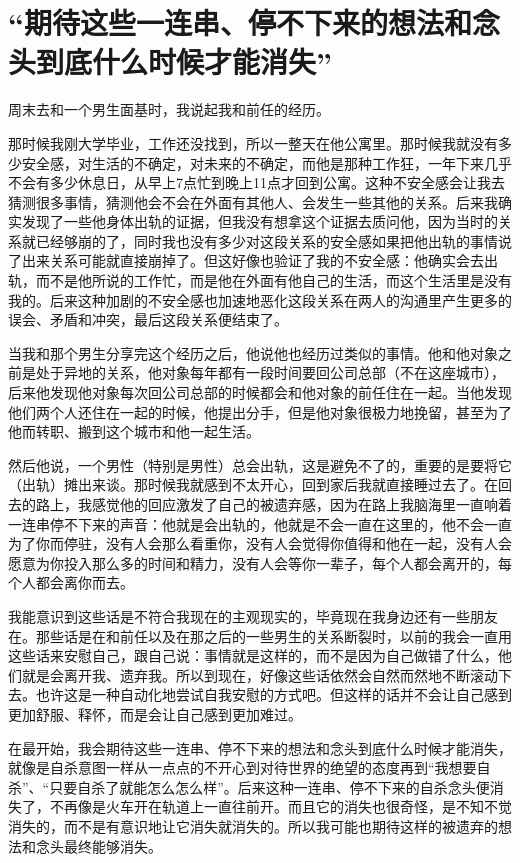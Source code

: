 \chapter{“期待这些一连串、停不下来的想法和念头到底什么时候才能消失”}




周末去和一个男生面基时，我说起我和前任的经历。

那时候我刚大学毕业，工作还没找到，所以一整天在他公寓里。那时候我就没有多少安全感，对生活的不确定，对未来的不确定，而他是那种工作狂，一年下来几乎不会有多少休息日，从早上7点忙到晚上11点才回到公寓。这种不安全感会让我去猜测很多事情，猜测他会不会在外面有其他人、会发生一些其他的关系。后来我确实发现了一些他身体出轨的证据，但我没有想拿这个证据去质问他，因为当时的关系就已经够崩的了，同时我也没有多少对这段关系的安全感\pozhehao{}如果把他出轨的事情说了出来关系可能就直接崩掉了。但这好像也验证了我的不安全感：他确实会去出轨，而不是他所说的工作忙，而是他在外面有他自己的生活，而这个生活里是没有我的。后来这种加剧的不安全感也加速地恶化这段关系\pozhehao{}在两人的沟通里产生更多的误会、矛盾和冲突，最后这段关系便结束了。

当我和那个男生分享完这个经历之后，他说他也经历过类似的事情。他和他对象之前是处于异地的关系，他对象每年都有一段时间要回公司总部（不在这座城市），后来他发现他对象每次回公司总部的时候都会和他对象的前任住在一起。当他发现他们两个人还住在一起的时候，他提出分手，但是他对象很极力地挽留，甚至为了他而转职、搬到这个城市和他一起生活。

然后他说，一个男性（特别是男性）总会出轨，这是避免不了的，重要的是要将它（出轨）摊出来谈。那时候我就感到不太开心，回到家后我就直接睡过去了。在回去的路上，我感觉他的回应激发了自己的被遗弃感，因为在路上我脑海里一直响着一连串停不下来的声音：他就是会出轨的，他就是不会一直在这里的，他不会一直为了你而停驻，没有人会那么看重你，没有人会觉得你值得和他在一起，没有人会愿意为你投入那么多的时间和精力，没有人会等你一辈子，每个人都会离开的，每个人都会离你而去。

我能意识到这些话是不符合我现在的主观现实的，毕竟现在我身边还有一些朋友在。那些话是在和前任以及在那之后的一些男生的关系断裂时，以前的我会一直用这些话来安慰自己，跟自己说：事情就是这样的，而不是因为自己做错了什么，他们就是会离开我、遗弃我。所以到现在，好像这些话依然会自然而然地不断滚动下去。也许这是一种自动化地尝试自我安慰的方式吧。但这样的话并不会让自己感到更加舒服、释怀，而是会让自己感到更加难过。

在最开始，我会期待这些一连串、停不下来的想法和念头到底什么时候才能消失，就像是自杀意图一样\pozhehao{}从一点点的不开心到对待世界的绝望的态度再到“我想要自杀”、“只要自杀了就能怎么怎么样”。后来这种一连串、停不下来的自杀念头便消失了，不再像是火车开在轨道上一直往前开。而且它的消失也很奇怪，是不知不觉消失的，而不是有意识地让它消失就消失的。所以我可能也期待这样的被遗弃的想法和念头最终能够消失。

